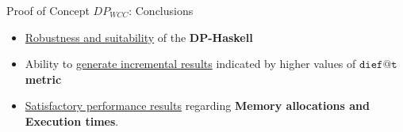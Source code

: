 
\begin{frame}[fragile]{Proof of Concept $DP_{WCC}$: Conclusions}
  \begin{itemize}
    \setlength\itemsep{2em}
    \item \underline{\color{red}Robustness and suitability} of the \textbf{DP-Haskell}
    \item Ability to \underline{\color{red}generate incremental results} indicated by higher values of \textbf{$\mathtt{dief@t}$ metric}
    \item \underline{\color{red}Satisfactory performance results} regarding \textbf{Memory allocations and Execution times}. 
  \end{itemize}
\end{frame}

